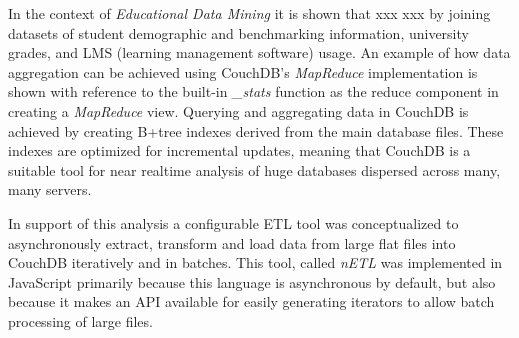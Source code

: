 In the context of \textit{Educational Data Mining} it is shown that xxx xxx  by joining datasets of student demographic and benchmarking information, university grades, and LMS (learning management software) usage. An example of how data aggregation can be achieved using CouchDB's \textit{MapReduce} implementation is shown with reference to the built-in \textit{\_stats} function as the reduce component in creating a \textit{MapReduce} view. Querying and aggregating data in CouchDB is achieved by creating B+tree indexes derived from the main database files. These indexes are optimized for incremental updates, meaning that CouchDB is a suitable tool for near realtime analysis of huge databases dispersed across many, many servers.

In support of this analysis a configurable ETL tool was conceptualized to asynchronously extract, transform and load data from large flat files into CouchDB iteratively and in batches. This tool, called \textit{nETL} was implemented in JavaScript primarily because this language is asynchronous by default, but also because it makes an API available for easily generating iterators to allow batch processing of large files.